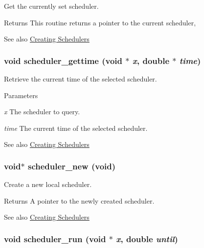 Get the currently set scheduler. \begin{DoxyReturn}{Returns}
This routine returns a pointer to the current scheduler, 
\end{DoxyReturn}
\begin{DoxySeeAlso}{See also}
\hyperlink{group__clocks_creating_schedulers}{Creating Schedulers} 
\end{DoxySeeAlso}
\hypertarget{group__clocks_gadbaa75aac36f99e3559827a55c12c36e}{
\subsubsection[{scheduler\_\-gettime}]{\setlength{\rightskip}{0pt plus 5cm}void scheduler\_\-gettime (void $\ast$ {\em x}, \/  double $\ast$ {\em time})}}
\label{group__clocks_gadbaa75aac36f99e3559827a55c12c36e}


Retrieve the current time of the selected scheduler. 
\begin{DoxyParams}{Parameters}
\item[{\em x}]The scheduler to query. \item[{\em time}]The current time of the selected scheduler. \end{DoxyParams}
\begin{DoxySeeAlso}{See also}
\hyperlink{group__clocks_creating_schedulers}{Creating Schedulers} 
\end{DoxySeeAlso}
\hypertarget{group__clocks_ga90e58fdc4b6aa7a1485220d808d6fc4b}{
\subsubsection[{scheduler\_\-new}]{\setlength{\rightskip}{0pt plus 5cm}void$\ast$ scheduler\_\-new (void)}}
\label{group__clocks_ga90e58fdc4b6aa7a1485220d808d6fc4b}


Create a new local scheduler. \begin{DoxyReturn}{Returns}
A pointer to the newly created scheduler. 
\end{DoxyReturn}
\begin{DoxySeeAlso}{See also}
\hyperlink{group__clocks_creating_schedulers}{Creating Schedulers} 
\end{DoxySeeAlso}
\hypertarget{group__clocks_ga69f8d9f511899d3f4b30f6b7a032849a}{
\subsubsection[{scheduler\_\-run}]{\setlength{\rightskip}{0pt plus 5cm}void scheduler\_\-run (void $\ast$ {\em x}, \/  double {\em until})}}
\label{group__clocks_ga69f8d9f511899d3f4b30f6b7a032849a}


